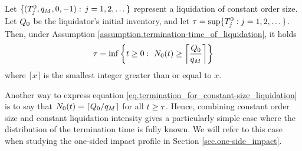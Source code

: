 \documentclass[10pt, article,table]{article}
\begin{document}
\begin{prop}\label{prop.termination_for_constant-size_liquidation}
 Let $\lbrace (\arrivalTimes[0]_j, q_{M}, 0, -1): \, j=1,2,\dots\rbrace$ represent a liquidation of constant order size. Let $\metaorderSize$ be the liquidator's initial inventory, and let $\terminationTime = \sup\lbrace \arrivalTimes[0]_j : j=1,2,\dots\rbrace$. Then, under Assumption \ref{assumption.termination-time_of_liquidation}, it holds
 \begin{equation}\label{eq.termination_for_constant-size_liquidation}
 \terminationTime = \inf \left\lbrace t\geq 0: \, \, \countingProc[0](t)\geq 
 \left\lceil \frac{\metaorderSize}{q_{M}}\right\rceil \right\rbrace
 \end{equation}
 where $\lceil x\rceil$ is the smallest integer greater than or equal to $x$. 
\end{prop}

Another way to express equation \eqref{eq.termination_for_constant-size_liquidation} is to say that $\countingProc[0](t) = \lceil\metaorderSize/q_{M}\rceil$ for all $t\geq \terminationTime$.
Hence, combining constant order size and constant liquidation intensity gives a particularly simple case where the distribution of the termination time is fully known. We will refer to this case when studying the one-sided impact profile in Section \ref{sec.one-side_impact}.
\end{document}
